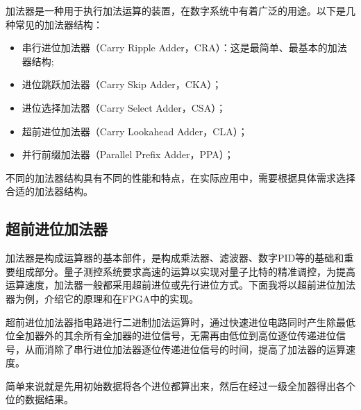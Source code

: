 加法器是一种用于执行加法运算的装置，在数字系统中有着广泛的用途。以下是几种常见的加法器结构：
\begin{itemize}
    \item 串行进位加法器（Carry Ripple Adder，CRA）：这是最简单、最基本的加法器结构;
    \item 进位跳跃加法器（Carry Skip Adder，CKA）；
    \item 进位选择加法器（Carry Select Adder，CSA）；
    \item 超前进位加法器（Carry Lookahead Adder，CLA）；
    \item 并行前缀加法器（Parallel Prefix Adder，PPA）；
\end{itemize}
 
不同的加法器结构具有不同的性能和特点，在实际应用中，需要根据具体需求选择合适的加法器结构。

\subsection[超前进位加法器]{超前进位加法器\label{section:carray_lookahead_adder}}

加法器是构成运算器的基本部件，是构成乘法器、滤波器、数字PID等的基础和重要组成部分。量子测控系统要求高速的运算以实现对量子比特的精准调控，为提高运算速度，加法器一般都采用超前进位或先行进位方式。下面我将以超前进位加法器为例，介绍它的原理和在FPGA中的实现。

超前进位加法器指电路进行二进制加法运算时，通过快速进位电路同时产生除最低位全加器外的其余所有全加器的进位信号，无需再由低位到高位逐位传递进位信号，从而消除了串行进位加法器逐位传递进位信号的时间，提高了加法器的运算速度。

简单来说就是先用初始数据将各个进位都算出来，然后在经过一级全加器得出各个位的数据结果。

